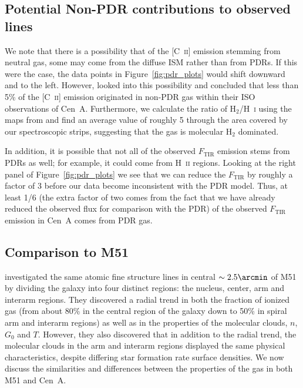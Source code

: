 \documentclass[preprint2]{aastex}
\begin{document}
\subsection{Potential Non-PDR contributions to observed lines}
We note that there is a possibility that of the [C~\textsc{ii}] emission stemming from neutral gas, some may come from the diffuse ISM rather than from PDRs.  If this were the case, the data points in Figure~\ref{fig:pdr_plots} would shift downward and to the left.  However, \citet{2000A&A...355..885U} looked into this possibility and concluded that less than 5\% of the [C~\textsc{ii}] emission originated in non-PDR gas within their ISO observations of Cen~A.  Furthermore, we calculate the ratio of H$_{2}$/H~\textsc{i} using the maps from \citet{2012MNRAS.422.2291P} and find an average value of roughly 5 through the area covered by our spectroscopic strips, suggesting that the gas is molecular H$_{2}$ dominated.

In addition, it is possible that not all of the observed $F_{\mathrm{TIR}}$ emission stems from PDRs as well; for example, it could come from H~\textsc{ii} regions.  Looking at the right panel of Figure~\ref{fig:pdr_plots} we see that we can reduce the $F_{\mathrm{TIR}}$ by roughly a factor of 3 before our data become inconsistent with the PDR model.  Thus, at least 1/6 (the extra factor of two comes from the fact that we have already reduced the observed flux for comparison with the PDR) of the observed $F_{\mathrm{TIR}}$ emission in Cen~A comes from PDR gas.

\subsection{Comparison to M51}\label{compare_m51}
\citet{parkin_2013} investigated the same atomic fine structure lines in central $\sim2.5\arcmin$ of M51 by dividing the galaxy into four distinct regions: the nucleus, center, arm and interarm regions.  They discovered a radial trend in both the fraction of ionized gas (from about 80\% in the central region of the galaxy down to 50\% in spiral arm and interarm regions) as well as in the properties of the molecular clouds, $n$, $G_{0}$ and $T$.  However, they also discovered that in addition to the radial trend, the molecular clouds in the arm and interarm regions displayed the same physical characteristics, despite differing star formation rate surface densities.  We now discuss the similarities and differences between the properties of the gas in both M51 and Cen~A.
\end{document}
